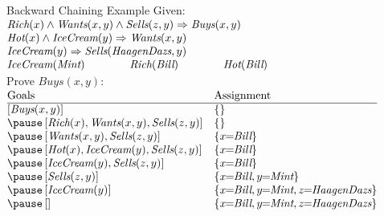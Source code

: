 \documentclass[14pt]{beamer}
\begin{document}
\begin{frame}[label=backward-chaining-example]{Backward Chaining Example}
\small
Given:\\
\tab$
\begin{array}{ @{} l @{\hspace{4em}} l @{\hspace{4em}} l @{}}
\lefteqn{\textit{Rich}(x) \land \textit{Wants}(x, y) \land \textit{Sells}(z, y) \limpl \textit{Buys}(x, y)} \\
\lefteqn{\textit{Hot}(x) \land \textit{IceCream}(y) \limpl \textit{Wants}(x, y)} \\
\lefteqn{\textit{IceCream}(y) \limpl \textit{Sells}(\textit{HaagenDazs}, y)} \\
\textit{IceCream}(\textit{Mint})
& \textit{Rich}(\textit{Bill})
& \textit{Hot}(\textit{Bill})
\end{array}
$\\[0.5em]
Prove $\textit{Buys}(x, y)$:
\\[0.5em]
\pause
$
\begin{array}{@{}ll@{}}
\mbox{Goals} & \mbox{Assignment} \\
\hline
\left[\textit{Buys}(x, y)\right]
& \{\}
\\\pause
\left[\textit{Rich}(x), \textit{Wants}(x, y), \textit{Sells}(z, y)\right]
& \{\}
\\\pause
\left[\textit{Wants}(x, y), \textit{Sells}(z, y)\right]
& \{x\!\!=\!\!\textit{Bill}\}
\\\pause
\left[\textit{Hot}(x), \textit{IceCream}(y), \textit{Sells}(z, y)\right]
& \{x\!\!=\!\!\textit{Bill}\}
\\\pause
\left[\textit{IceCream}(y), \textit{Sells}(z, y)\right]
& \{x\!\!=\!\!\textit{Bill}\}
\\\pause
\left[\textit{Sells}(z, y)\right]
& \{x\!\!=\!\!\textit{Bill}, y\!\!=\!\!\textit{Mint}\}
\\\pause
\left[\textit{IceCream}(y)\right]
& \{x\!\!=\!\!\textit{Bill}, y\!\!=\!\!\textit{Mint}, z\!\!=\!\!\textit{HaagenDazs}\}
\\\pause
\left[\right]
& \{x\!\!=\!\!\textit{Bill}, y\!\!=\!\!\textit{Mint}, z\!\!=\!\!\textit{HaagenDazs}\}
\end{array}
$
\end{frame}
\end{document}
